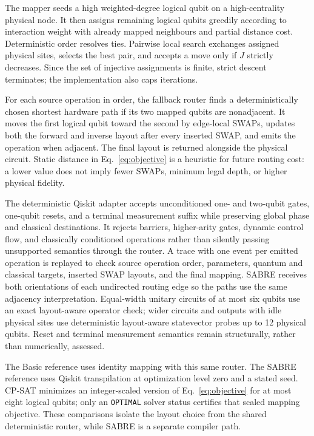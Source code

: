 \documentclass[a4paper,10pt,twocolumn]{article}
\begin{document}
The mapper seeds a high weighted-degree logical qubit on a high-centrality
physical node. It then assigns remaining logical qubits greedily according
to interaction weight with already mapped neighbours and partial distance
cost. Deterministic order resolves ties. Pairwise local search exchanges
assigned physical sites, selects the best pair, and accepts a move only if
$J$ strictly decreases. Since the set of injective assignments is finite,
strict descent terminates; the implementation also caps iterations.

For each source operation in order, the fallback router finds a
deterministically chosen shortest hardware path if its two mapped qubits
are nonadjacent. It moves the first logical qubit toward the second by
edge-local SWAPs, updates both the forward and inverse layout after every
inserted SWAP, and emits the operation when adjacent. The final layout is returned
alongside the physical circuit. Static distance in Eq.~\eqref{eq:objective}
is a heuristic for future routing cost: a lower value does not imply fewer
SWAPs, minimum legal depth, or higher physical fidelity.

The deterministic Qiskit adapter accepts unconditioned one- and two-qubit
gates, one-qubit resets, and a terminal measurement suffix while preserving
global phase and classical destinations. It rejects barriers, higher-arity
gates, dynamic control flow, and classically conditioned operations rather
than silently passing unsupported semantics through the router. A trace with
one event per emitted operation is replayed to check source operation order,
parameters, quantum and classical targets, inserted SWAP layouts, and the
final mapping. SABRE receives both orientations of each undirected routing
edge so the paths use the same adjacency interpretation. Equal-width unitary
circuits of at most six qubits use an exact layout-aware operator check;
wider circuits and outputs with idle physical sites use deterministic
layout-aware statevector probes up to 12 physical qubits. Reset and terminal
measurement semantics remain structurally, rather than numerically, assessed.

The Basic reference uses identity mapping with this same router. The SABRE
reference uses Qiskit transpilation at optimization level zero and a stated
seed. CP-SAT minimizes an integer-scaled version of Eq.~\eqref{eq:objective}
for at most eight logical qubits; only an \texttt{OPTIMAL} solver status
certifies that scaled mapping objective. These comparisons isolate the
layout choice from the shared deterministic router, while SABRE is a
separate compiler path.
\end{document}
